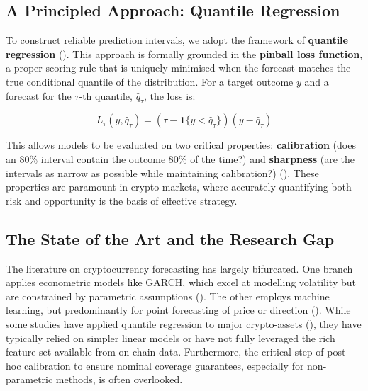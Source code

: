 \documentclass[
  a4paper,
  DIV=11,
  numbers=noendperiod]{scrreprt}
\begin{document}
\subsection{A Principled Approach: Quantile
Regression}\label{a-principled-approach-quantile-regression}

To construct reliable prediction intervals, we adopt the framework of
\textbf{quantile regression} (). This approach is formally grounded in the
\textbf{pinball loss function}, a proper scoring rule that is uniquely
minimised when the forecast matches the true conditional quantile of the
distribution. For a target outcome \(y\) and a forecast for the
\(\tau\)-th quantile, \(\hat{q}_{\tau}\), the loss is:

\[L_{\tau}(y, \hat{q}_{\tau}) = (\tau - \mathbf{1}\{y < \hat{q}_{\tau}\})(y - \hat{q}_{\tau})\]

This allows models to be evaluated on two critical properties:
\textbf{calibration} (does an 80\% interval contain the outcome 80\% of
the time?) and \textbf{sharpness} (are the intervals as narrow as
possible while maintaining calibration?)
(). These
properties are paramount in crypto markets, where accurately quantifying
both risk and opportunity is the basis of effective strategy.

\subsection{The State of the Art and the Research
Gap}\label{the-state-of-the-art-and-the-research-gap}

The literature on cryptocurrency forecasting has largely bifurcated. One
branch applies econometric models like GARCH, which excel at modelling
volatility but are constrained by parametric assumptions
(). The other employs
machine learning, but predominantly for point forecasting of price or
direction ().
While some studies have applied quantile regression to major
crypto-assets (),
they have typically relied on simpler linear models or have not fully
leveraged the rich feature set available from on-chain data.
Furthermore, the critical step of post-hoc calibration to ensure nominal
coverage guarantees, especially for non-parametric methods, is often
overlooked.
\end{document}
